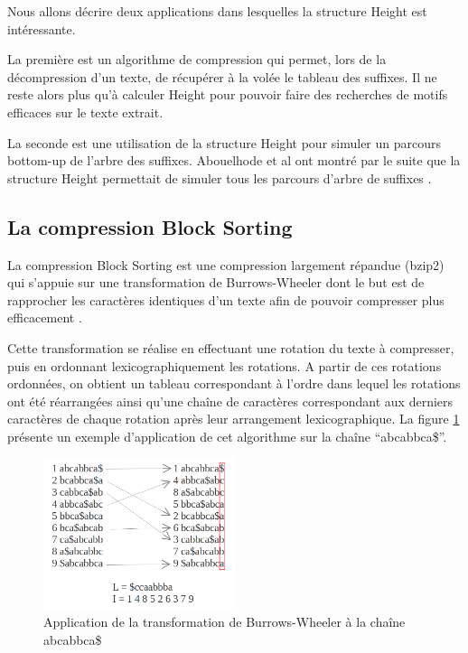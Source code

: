 \documentclass[a4paper,10pt]{article}
\begin{document}
Nous allons décrire deux applications dans lesquelles la structure
Height est intéressante. 

La première est un algorithme de compression
qui permet, lors de la décompression d'un texte, de récupérer à la
volée le tableau des suffixes. Il ne reste alors plus qu'à calculer
Height pour pouvoir faire des recherches de motifs efficaces sur le
texte extrait.

La seconde est une utilisation de la structure Height pour simuler un
parcours bottom-up de l'arbre des suffixes. Abouelhode et al ont
montré par le suite que la structure Height permettait de simuler tous
les parcours d'arbre de suffixes \cite{Abouelhoda200453}.

\subsection{La compression Block Sorting}
\label{sec:blocksorting}

La compression Block Sorting est une compression largement répandue
(bzip2) qui s'appuie sur une transformation de Burrows-Wheeler
dont le but est de rapprocher les caractères identiques d'un texte
afin de pouvoir compresser plus efficacement \cite{Burrows94}.

Cette transformation se réalise en effectuant une rotation du texte à
compresser, puis en ordonnant lexicographiquement les rotations. A
partir de ces rotations ordonnées, on obtient un tableau correspondant
à l'ordre dans lequel les rotations ont été réarrangées ainsi qu'une
chaîne de caractères correspondant aux derniers caractères de chaque
rotation après leur arrangement lexicographique. La figure
\ref{fig:burrows} présente un exemple d'application de cet algorithme
sur la chaîne ``abcabbca\$''. 

\begin{figure}
  \centering
  \includegraphics[width=0.5\textwidth]{full_burrows}
  \caption{Application de la transformation de Burrows-Wheeler à la
    chaîne abcabbca\$}
  \label{fig:burrows}
\end{figure}
\end{document}
